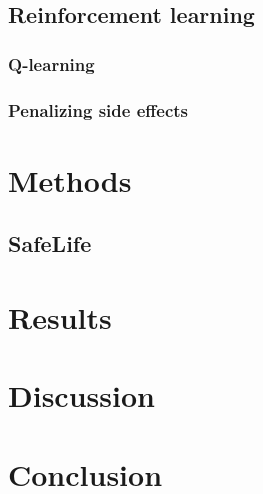 \documentclass[12pt,A4]{report}
\theoremstyle{definition}
\begin{document}


\section{Reinforcement learning}

\subsection{Q-learning}


\subsection{Penalizing side effects}






\chapter{Methods}

\section{SafeLife}




\chapter{Results}




\chapter{Discussion}




\chapter{Conclusion}


\printbibliography
\end{document}
